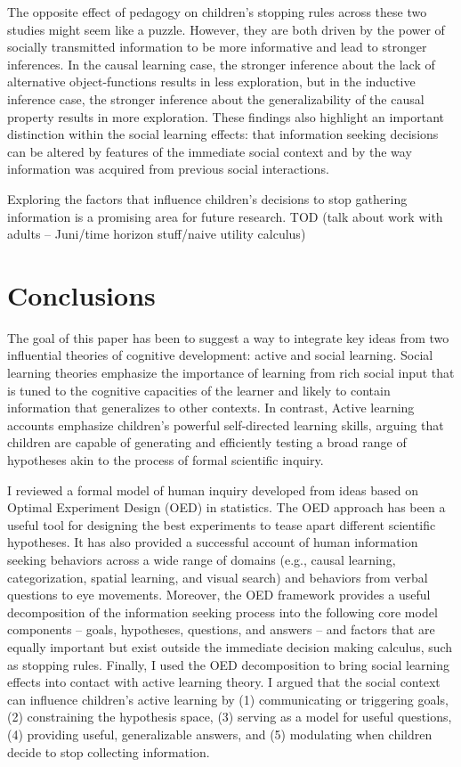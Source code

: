 \documentclass[english,floatsintext,man]{apa6}
\theoremstyle{definition}
\theoremstyle{definition}
\theoremstyle{definition}
\theoremstyle{remark}
\begin{document}
The opposite effect of pedagogy on children's stopping rules across
these two studies might seem like a puzzle. However, they are both
driven by the power of socially transmitted information to be more
informative and lead to stronger inferences. In the causal learning
case, the stronger inference about the lack of alternative
object-functions results in less exploration, but in the inductive
inference case, the stronger inference about the generalizability of the
causal property results in more exploration. These findings also
highlight an important distinction within the social learning effects:
that information seeking decisions can be altered by features of the
immediate social context and by the way information was acquired from
previous social interactions.

Exploring the factors that influence children's decisions to stop
gathering information is a promising area for future research. TOD (talk
about work with adults -- Juni/time horizon stuff/naive utility
calculus)

\section{Conclusions}\label{conclusions}

The goal of this paper has been to suggest a way to integrate key ideas
from two influential theories of cognitive development: active and
social learning. Social learning theories emphasize the importance of
learning from rich social input that is tuned to the cognitive
capacities of the learner and likely to contain information that
generalizes to other contexts. In contrast, Active learning accounts
emphasize children's powerful self-directed learning skills, arguing
that children are capable of generating and efficiently testing a broad
range of hypotheses akin to the process of formal scientific inquiry.

I reviewed a formal model of human inquiry developed from ideas based on
Optimal Experiment Design (OED) in statistics. The OED approach has been
a useful tool for designing the best experiments to tease apart
different scientific hypotheses. It has also provided a successful
account of human information seeking behaviors across a wide range of
domains (e.g., causal learning, categorization, spatial learning, and
visual search) and behaviors from verbal questions to eye movements.
Moreover, the OED framework provides a useful decomposition of the
information seeking process into the following core model components --
goals, hypotheses, questions, and answers -- and factors that are
equally important but exist outside the immediate decision making
calculus, such as stopping rules. Finally, I used the OED decomposition
to bring social learning effects into contact with active learning
theory. I argued that the social context can influence children's active
learning by (1) communicating or triggering goals, (2) constraining the
hypothesis space, (3) serving as a model for useful questions, (4)
providing useful, generalizable answers, and (5) modulating when
children decide to stop collecting information.
\end{document}
